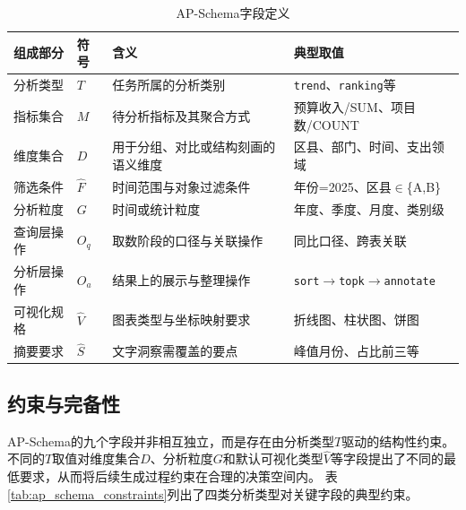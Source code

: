 \begin{table}[htbp]
	\setlength{\abovecaptionskip}{5pt}
	\setlength{\belowcaptionskip}{5pt}
	\caption{AP-Schema字段定义}\label{tab:ap_schema_fields}
	\centering
	\footnotesize
	\renewcommand{\arraystretch}{1.4}
	\begin{tabular}{p{2.0cm}p{1.0cm}p{4.8cm}p{4.5cm}}
		\toprule
		组成部分 & 符号 & 含义 & 典型取值 \\
		\midrule
			分析类型 & $T$ & 任务所属的分析类别 & \texttt{trend}、\texttt{ranking}等 \\
			指标集合 & $M$ & 待分析指标及其聚合方式 & 预算收入/SUM、项目数/COUNT \\
			维度集合 & $D$ & 用于分组、对比或结构刻画的语义维度 & 区县、部门、时间、支出领域 \\
			筛选条件 & $\hat{F}$ & 时间范围与对象过滤条件 & 年份=2025、区县$\in$\{A,B\} \\
			分析粒度 & $G$ & 时间或统计粒度 & 年度、季度、月度、类别级 \\
		查询层操作 & $O_q$ & 取数阶段的口径与关联操作 & 同比口径、跨表关联 \\
		分析层操作 & $O_a$ & 结果上的展示与整理操作 & \texttt{sort}$\to$\texttt{topk}$\to$\texttt{annotate} \\
		可视化规格 & $\hat{V}$ & 图表类型与坐标映射要求 & 折线图、柱状图、饼图 \\
		摘要要求 & $\hat{S}$ & 文字洞察需覆盖的要点 & 峰值月份、占比前三等 \\
		\bottomrule
	\end{tabular}
	\renewcommand{\arraystretch}{1.0}
\end{table}

\subsection{约束与完备性}\label{subsec:ap_schema_valid}

AP-Schema的九个字段并非相互独立，而是存在由分析类型$T$驱动的结构性约束。不同的$T$取值对维度集合$D$、分析粒度$G$和默认可视化类型$\hat{V}$等字段提出了不同的最低要求，从而将后续生成过程约束在合理的决策空间内。
表\ref{tab:ap_schema_constraints}列出了四类分析类型对关键字段的典型约束。

